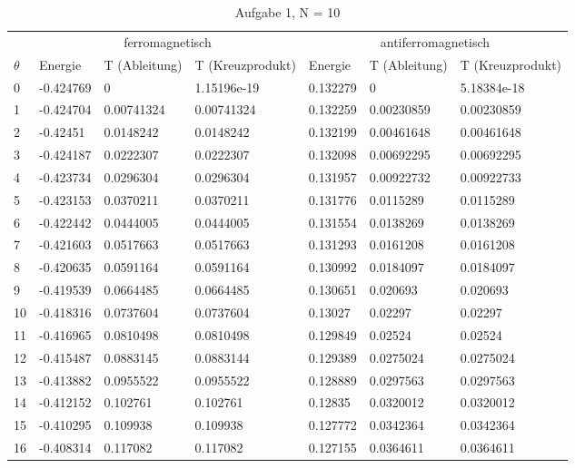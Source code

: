 \begin{longtable}{l|lll|lll}
\caption[]{Aufgabe 1, N = 10}\\
\hline\hline
& \multicolumn{3}{c}{ferromagnetisch} & \multicolumn{3}{c}{antiferromagnetisch} \\
$\theta$ & Energie & T (Ableitung) & T (Kreuzprodukt) & Energie & T (Ableitung) & T (Kreuzprodukt) \\
\hline
\endhead
\hline
   0 & -0.424769    & 0           & 1.15196e-19 &  0.132279    & 0           & 5.18384e-18 \\
   1 & -0.424704    & 0.00741324  & 0.00741324  &  0.132259    & 0.00230859  & 0.00230859  \\
   2 & -0.42451     & 0.0148242   & 0.0148242   &  0.132199    & 0.00461648  & 0.00461648  \\
   3 & -0.424187    & 0.0222307   & 0.0222307   &  0.132098    & 0.00692295  & 0.00692295  \\
   4 & -0.423734    & 0.0296304   & 0.0296304   &  0.131957    & 0.00922732  & 0.00922733  \\
   5 & -0.423153    & 0.0370211   & 0.0370211   &  0.131776    & 0.0115289   & 0.0115289   \\
   6 & -0.422442    & 0.0444005   & 0.0444005   &  0.131554    & 0.0138269   & 0.0138269   \\
   7 & -0.421603    & 0.0517663   & 0.0517663   &  0.131293    & 0.0161208   & 0.0161208   \\
   8 & -0.420635    & 0.0591164   & 0.0591164   &  0.130992    & 0.0184097   & 0.0184097   \\
   9 & -0.419539    & 0.0664485   & 0.0664485   &  0.130651    & 0.020693    & 0.020693    \\
  10 & -0.418316    & 0.0737604   & 0.0737604   &  0.13027     & 0.02297     & 0.02297     \\
  11 & -0.416965    & 0.0810498   & 0.0810498   &  0.129849    & 0.02524     & 0.02524     \\
  12 & -0.415487    & 0.0883145   & 0.0883144   &  0.129389    & 0.0275024   & 0.0275024   \\
  13 & -0.413882    & 0.0955522   & 0.0955522   &  0.128889    & 0.0297563   & 0.0297563   \\
  14 & -0.412152    & 0.102761    & 0.102761    &  0.12835     & 0.0320012   & 0.0320012   \\
  15 & -0.410295    & 0.109938    & 0.109938    &  0.127772    & 0.0342364   & 0.0342364   \\
  16 & -0.408314    & 0.117082    & 0.117082    &  0.127155    & 0.0364611   & 0.0364611   \\

\end{longtable}
